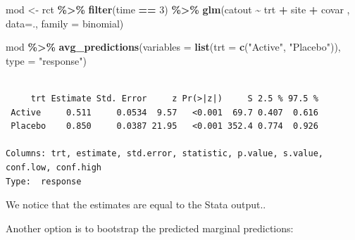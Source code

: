 \documentclass[
]{book}
\newenvironment{Shaded}{\begin{snugshade}}{\end{snugshade}}
\newcommand{\AttributeTok}[1]{\textcolor[rgb]{0.13,0.29,0.53}{#1}}
\newcommand{\DecValTok}[1]{\textcolor[rgb]{0.00,0.00,0.81}{#1}}
\newcommand{\FunctionTok}[1]{\textcolor[rgb]{0.13,0.29,0.53}{\textbf{#1}}}
\newcommand{\NormalTok}[1]{#1}
\newcommand{\OtherTok}[1]{\textcolor[rgb]{0.56,0.35,0.01}{#1}}
\newcommand{\SpecialCharTok}[1]{\textcolor[rgb]{0.81,0.36,0.00}{\textbf{#1}}}
\newcommand{\StringTok}[1]{\textcolor[rgb]{0.31,0.60,0.02}{#1}}
\begin{document}
\begin{Shaded}
\begin{Highlighting}[]
\NormalTok{mod }\OtherTok{\textless{}{-}}\NormalTok{ rct }\SpecialCharTok{\%\textgreater{}\%} 
  \FunctionTok{filter}\NormalTok{(time }\SpecialCharTok{==} \DecValTok{3}\NormalTok{) }\SpecialCharTok{\%\textgreater{}\%}
  \FunctionTok{glm}\NormalTok{(catout }\SpecialCharTok{\textasciitilde{}}\NormalTok{ trt }\SpecialCharTok{+}\NormalTok{ site }\SpecialCharTok{+}\NormalTok{ covar , }\AttributeTok{data=}\NormalTok{., }\AttributeTok{family =}\NormalTok{ binomial)}

\NormalTok{mod }\SpecialCharTok{\%\textgreater{}\%}
  \FunctionTok{avg\_predictions}\NormalTok{(}\AttributeTok{variables =} \FunctionTok{list}\NormalTok{(}\AttributeTok{trt =} \FunctionTok{c}\NormalTok{(}\StringTok{"Active"}\NormalTok{, }\StringTok{"Placebo"}\NormalTok{)), }\AttributeTok{type =} \StringTok{"response"}\NormalTok{) }
\end{Highlighting}
\end{Shaded}

\begin{verbatim}

     trt Estimate Std. Error     z Pr(>|z|)     S 2.5 % 97.5 %
 Active     0.511     0.0534  9.57   <0.001  69.7 0.407  0.616
 Placebo    0.850     0.0387 21.95   <0.001 352.4 0.774  0.926

Columns: trt, estimate, std.error, statistic, p.value, s.value, conf.low, conf.high 
Type:  response 
\end{verbatim}

We notice that the estimates are equal to the Stata output..

Another option is to bootstrap the predicted marginal predictions:
\end{document}

